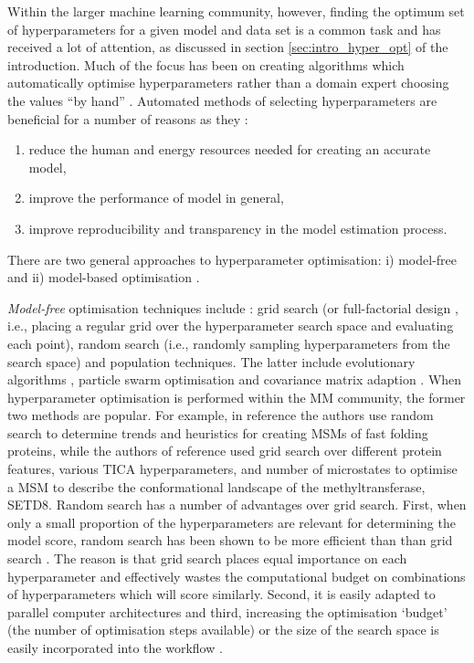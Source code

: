 Within the larger machine learning community, however, finding the optimum set of hyperparameters for a given model and data set is a common task and has received a lot of attention, as discussed in section \ref{sec:intro_hyper_opt} of the introduction. Much of the focus has been on creating algorithms which automatically optimise hyperparameters rather than a domain expert choosing the values ``by hand'' \cite{feurer2019hyperparameter}.  Automated methods of selecting hyperparameters are beneficial for a number of reasons as they \cite{feurer2019hyperparameter}:
\begin{enumerate}
    \item reduce the human and energy resources needed for creating an accurate model,
    \item improve the performance of model in general,
    \item improve reproducibility and transparency in the model estimation process. 
\end{enumerate}
There are two general approaches to hyperparameter optimisation: i) model-free and ii) model-based optimisation \cite{feurer2019hyperparameter}. 

\emph{Model-free} optimisation techniques include \cite{feurer2019hyperparameter}: grid search (or full-factorial design \cite{c1997montgomery}, i.e., placing a regular grid over the hyperparameter search space and evaluating each point), random search (i.e., randomly sampling hyperparameters from the search space)  and population techniques. The latter include evolutionary algorithms \cite{simon2013evolutionary},  particle swarm optimisation \cite{kennedyParticleSwarmOptimization1995,eberhart1998comparison} and covariance matrix adaption \cite{hansenCMAEvolutionStrategy2016}.  When hyperparameter optimisation is performed within the MM community, the former two methods are popular. For example, in reference \cite{husicOptimizedParameterSelection2016} the authors use random search to determine trends and heuristics for creating MSMs of fast folding proteins, while the authors of reference \cite{chenDynamicConformationalLandscape2019} used grid search over different protein features, various TICA hyperparameters, and number of microstates to optimise a MSM to describe the conformational landscape of the methyltransferase, SETD8. Random search has a number of advantages over grid search. First, when only a small proportion of the hyperparameters are relevant for determining the model score, random search has been shown  to be more efficient than  than grid search \cite{bergstrajamesbergstraRandomSearchHyperParameter2012}. The reason is that grid search places equal importance on each hyperparameter and effectively wastes the computational budget on combinations of hyperparameters which will score similarly. Second, it is easily adapted to parallel computer architectures and third, increasing the optimisation `budget' (the number of optimisation steps available) or the size of the search space is easily incorporated into the workflow \cite{feurer2019hyperparameter}.

